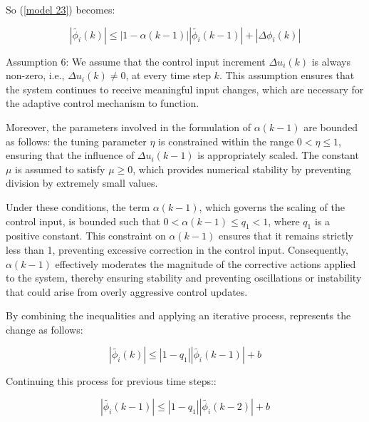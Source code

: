 \documentclass[journal,onecolumn]{IEEEtran}
\begin{document}
So  (\ref{model 23}) becomes:

\begin{equation}
\label{model 22}
|\tilde{\phi_i}(k)| \leq |1 - \alpha(k-1)| |\tilde{\phi_i}(k-1)| + |\Delta \phi_i(k)|
\end{equation}



Assumption 6: We assume that the control input increment \(\Delta u_i(k)\) is always non-zero, i.e., \(\Delta u_i(k) \neq 0\), at every time step \(k\). This assumption ensures that the system continues to receive meaningful input changes, which are necessary for the adaptive control mechanism to function. 

Moreover, the parameters involved in the formulation of \(\alpha(k-1)\) are bounded as follows: the tuning parameter \(\eta\) is constrained within the range \(0 < \eta \leq 1\), ensuring that the influence of \(\Delta u_i(k-1)\) is appropriately scaled. The constant \(\mu\) is assumed to satisfy \(\mu \geq 0\), which provides numerical stability by preventing division by extremely small values. 

Under these conditions, the term \(\alpha(k-1)\), which governs the scaling of the control input, is bounded such that \(0 < \alpha(k-1) \leq q_1 < 1\), where \(q_1\) is a positive constant. This constraint on \(\alpha(k-1)\) ensures that it remains strictly less than 1, preventing excessive correction in the control input. Consequently, \(\alpha(k-1)\) effectively moderates the magnitude of the corrective actions applied to the system, thereby ensuring stability and preventing oscillations or instability that could arise from overly aggressive control updates.



By combining the inequalities and applying an iterative process, represents the change as follows:

\begin{equation}
\label{model 23}
|\tilde{\phi_i}(k)| \leq |1 - q_1| |\tilde{\phi_i}(k-1)| + b
\end{equation}

Continuing this process for previous time steps::

\begin{equation}
\label{model 24}
|\tilde{\phi_i}(k-1)| \leq |1 - q_1| |\tilde{\phi_i}(k-2)| + b
\end{equation}
\end{document}

